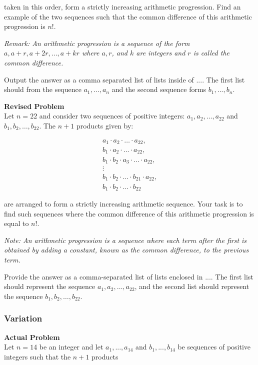 taken in this order, form a strictly increasing arithmetic progression. Find an example of the two sequences such that the common difference of this arithmetic progression is $n!$.

\textit{Remark: An arithmetic progression is a sequence of the form $a, a + r, a + 2r, ..., a + kr$ where $a, r$, and $k$ are integers and $r$ is called the common difference.}

Output the answer as a comma separated list of lists inside of $\boxed{...}$. The first list should from the sequence $a_1, ..., a_n$ and the second sequence forms $b_1, ..., b_n$.

\textbf{Revised Problem}\\
Let $n = 22$ and consider two sequences of positive integers: $a_1, a_2, \ldots, a_{22}$ and $b_1, b_2, \ldots, b_{22}$. The $n+1$ products given by:

\[
\begin{align*}
    a_1 \cdot a_2 \cdot \ldots \cdot a_{22}, \\
    b_1 \cdot a_2 \cdot \ldots \cdot a_{22}, \\
    b_1 \cdot b_2 \cdot a_3 \cdot \ldots \cdot a_{22}, \\
    \vdots \\
    b_1 \cdot b_2 \cdot \ldots \cdot b_{21} \cdot a_{22}, \\
    b_1 \cdot b_2 \cdot \ldots \cdot b_{22}
\end{align*}
\]

are arranged to form a strictly increasing arithmetic sequence. Your task is to find such sequences where the common difference of this arithmetic progression is equal to $n!$.

\textit{Note: An arithmetic progression is a sequence where each term after the first is obtained by adding a constant, known as the common difference, to the previous term.}

Provide the answer as a comma-separated list of lists enclosed in $\boxed{...}$. The first list should represent the sequence $a_1, a_2, \ldots, a_{22}$, and the second list should represent the sequence $b_1, b_2, \ldots, b_{22}$.

\subsubsection{Variation}
\textbf{Actual Problem}\\
Let $n = 14$ be an integer and let $a_1, ..., a_{14}$ and $b_1, ..., b_{14}$ be sequences of positive integers such that the $n+1$ products

